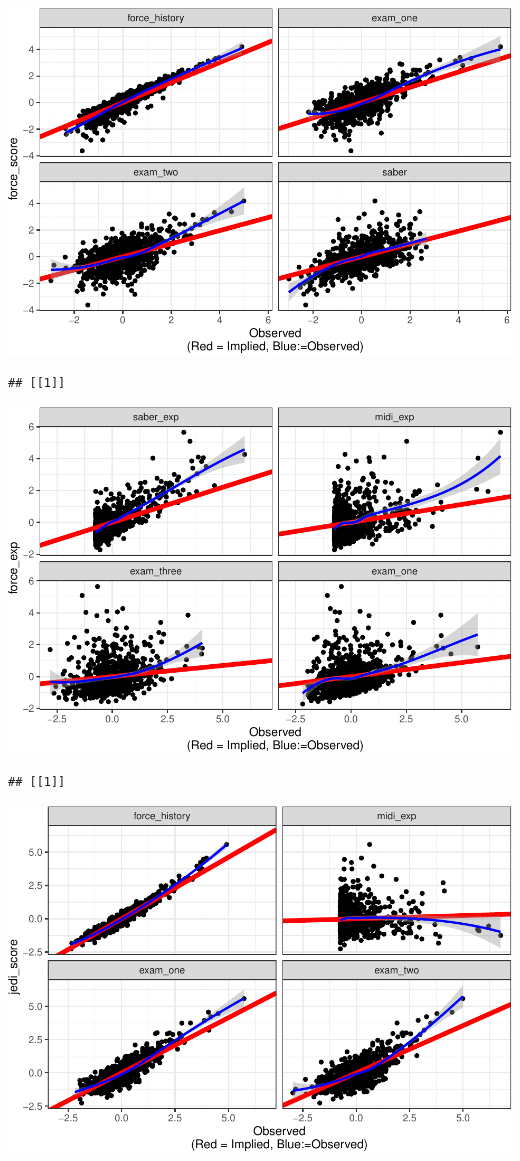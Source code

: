 \documentclass[
  english,
  doc]{apa6}
\begin{document}
\includegraphics{flexplavaan_draft_files/figure-latex/unnamed-chunk-1-1.pdf}

\begin{verbatim}
## [[1]]
\end{verbatim}

\includegraphics{flexplavaan_draft_files/figure-latex/unnamed-chunk-1-2.pdf}

\begin{verbatim}
## [[1]]
\end{verbatim}

\includegraphics{flexplavaan_draft_files/figure-latex/unnamed-chunk-1-3.pdf}
\end{document}

